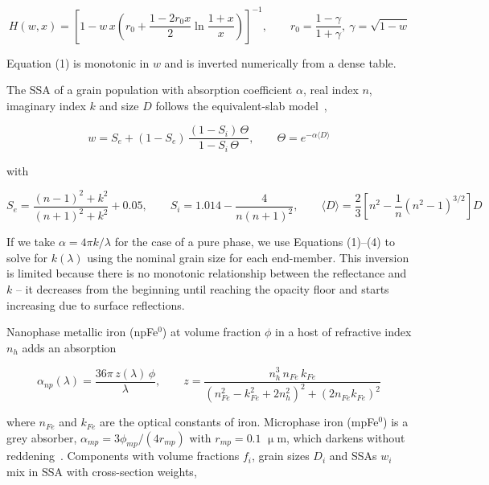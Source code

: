 \documentclass[remotesensing,article,submit,pdftex,moreauthors]{Definitions/mdpi}
\begin{document}
\begin{equation}
H(w,x) = \left[1 - w\,x\left(r_0 + \frac{1-2r_0x}{2}\ln\frac{1+x}{x}\right)\right]^{-1},\qquad r_0=\frac{1-\gamma}{1+\gamma},\ \gamma=\sqrt{1-w}
\label{eq2}
\end{equation}

Equation (1) is monotonic in $w$ and is inverted numerically from a dense table.

The SSA of a grain population with absorption coefficient $\alpha$, real index $n$, imaginary index $k$ and size $D$ follows the equivalent-slab model~\cite{hapke1993},

\begin{equation}
w = S_e + (1-S_e)\,\frac{(1-S_i)\,\Theta}{1-S_i\,\Theta},\qquad \Theta = e^{-\alpha\langle D\rangle}
\label{eq3}
\end{equation}

with

\begin{equation}
S_e = \frac{(n-1)^2+k^2}{(n+1)^2+k^2} + 0.05,\qquad S_i = 1.014 - \frac{4}{n(n+1)^2},\qquad \langle D\rangle = \frac{2}{3}\left[n^2-\frac{1}{n}(n^2-1)^{3/2}\right]D
\label{eq4}
\end{equation}

If we take $\alpha = 4\pi k/\lambda$ for the case of a pure phase, we use Equations (1)--(4) to solve for $k(\lambda)$ using the nominal grain size for each end-member. This inversion is limited because there is no monotonic relationship between the reflectance and $k$ -- it decreases from the beginning until reaching the opacity floor and starts increasing due to surface reflections.

Nanophase metallic iron (npFe$^{0}$) at volume fraction $\phi$ in a host of refractive index $n_h$ adds an absorption~\cite{hapke2001,lucey2011}

\begin{equation}
\alpha_{np}(\lambda) = \frac{36\pi\, z(\lambda)\,\phi}{\lambda},\qquad z = \frac{n_h^3\, n_{Fe}\, k_{Fe}}{\left(n_{Fe}^2-k_{Fe}^2+2n_h^2\right)^2+\left(2n_{Fe}k_{Fe}\right)^2}
\label{eq5}
\end{equation}

where $n_{Fe}$ and $k_{Fe}$ are the optical constants of iron. Microphase iron (mpFe$^{0}$) is a grey absorber, $\alpha_{mp} = 3\phi_{mp}/(4 r_{mp})$ with $r_{mp} = 0.1$ $\upmu$m, which darkens without reddening~\cite{lucey2011}. Components with volume fractions $f_i$, grain sizes $D_i$ and SSAs $w_i$ mix in SSA with cross-section weights,
\end{document}
